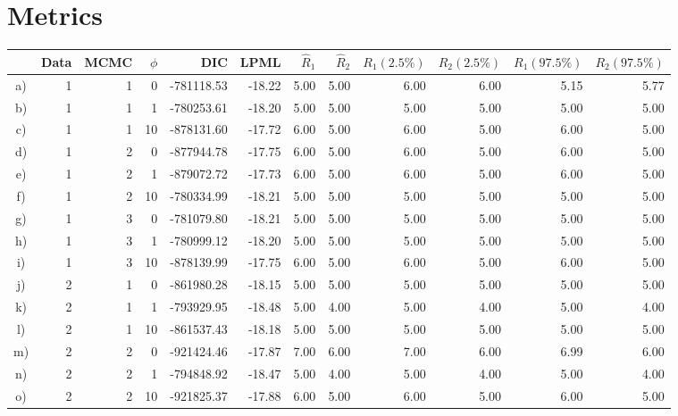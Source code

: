 \documentclass[10pt]{article} %
\begin{document}
\section{Metrics}
\begin{table}[H]
\centering
\begin{tabular}{crrrrrrrrrrr}
  \hline
  \rule{0pt}{2.6ex}
  & Data & MCMC & $\phi$ & DIC & LPML & $\hat{R}_1$ & $\hat{R}_2$ & $R_1 (2.5\%)$ & $R_2 (2.5\%)$ & $R_1 (97.5\%)$ & $R_2 (97.5\%)$\\
  \hline
  a) &   1 &   1 &   0 & -781118.53 & -18.22 & 5.00 & 5.00 & 6.00 & 6.00 & 5.15 & 5.77 \\
  b) &   1 &   1 &   1 & -780253.61 & -18.20 & 5.00 & 5.00 & 5.00 & 5.00 & 5.00 & 5.00 \\
  c) &   1 &   1 &  10 & -878131.60 & -17.72 & 6.00 & 5.00 & 6.00 & 5.00 & 6.00 & 5.00 \\
  \hline
  d) &   1 &   2 &   0 & -877944.78 & -17.75 & 6.00 & 5.00 & 6.00 & 5.00 & 6.00 & 5.00 \\
  e) &   1 &   2 &   1 & -879072.72 & -17.73 & 6.00 & 5.00 & 6.00 & 5.00 & 6.00 & 5.00 \\
  f) &   1 &   2 &  10 & -780334.99 & -18.21 & 5.00 & 5.00 & 5.00 & 5.00 & 5.00 & 5.00 \\
  \hline
  g) &   1 &   3 &   0 & -781079.80 & -18.21 & 5.00 & 5.00 & 5.00 & 5.00 & 5.00 & 5.00 \\
  h) &   1 &   3 &   1 & -780999.12 & -18.20 & 5.00 & 5.00 & 5.00 & 5.00 & 5.00 & 5.00 \\
  i) &   1 &   3 &  10 & -878139.99 & -17.75 & 6.00 & 5.00 & 6.00 & 5.00 & 6.00 & 5.00 \\
  \hline\hline
  j) &   2 &   1 &   0 & -861980.28 & -18.15 & 5.00 & 5.00 & 5.00 & 5.00 & 5.00 & 5.00 \\
  k) &   2 &   1 &   1 & -793929.95 & -18.48 & 5.00 & 4.00 & 5.00 & 4.00 & 5.00 & 4.00 \\
  l) &   2 &   1 &  10 & -861537.43 & -18.18 & 5.00 & 5.00 & 5.00 & 5.00 & 5.00 & 5.00 \\
  \hline
  m) &   2 &   2 &   0 & -921424.46 & -17.87 & 7.00 & 6.00 & 7.00 & 6.00 & 6.99 & 6.00 \\
  n) &   2 &   2 &   1 & -794848.92 & -18.47 & 5.00 & 4.00 & 5.00 & 4.00 & 5.00 & 4.00 \\
  o) &   2 &   2 &  10 & -921825.37 & -17.88 & 6.00 & 5.00 & 6.00 & 5.00 & 6.00 & 5.00 \\

\end{tabular}
\end{table}
\end{document}
